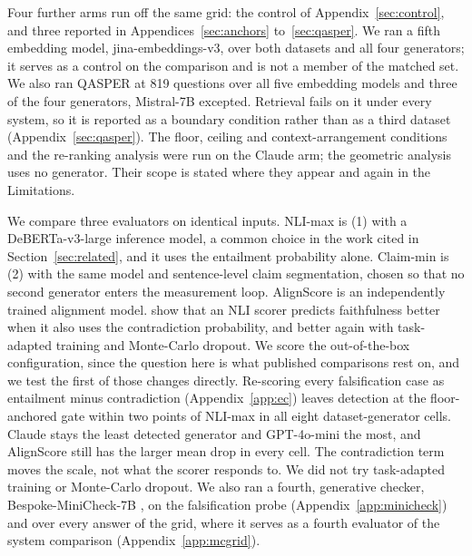 \documentclass[11pt]{article}
\newcommand{\movedref}{Appendix}            %
\newcommand{\movedref}{Section}
\begin{document}
Four further arms run off the same grid: the control of \movedref~\ref{sec:control}, and three reported in Appendices~\ref{sec:anchors} to~\ref{sec:qasper}. We ran a fifth embedding model, jina-embeddings-v3, over both datasets and all four generators; it serves as a control on the comparison and is not a member of the matched set. We also ran QASPER \citep{dasigi-etal-2021} at 819 questions over all five embedding models and three of the four generators, Mistral-7B excepted. Retrieval fails on it under every system, so it is reported as a boundary condition rather than as a third dataset (Appendix~\ref{sec:qasper}). The floor, ceiling and context-arrangement conditions and the re-ranking analysis were run on the Claude arm; the geometric analysis uses no generator. Their scope is stated where they appear and again in the Limitations.

We compare three evaluators on identical inputs. NLI-max is (1) with a DeBERTa-v3-large \citep{he-etal-2023} inference model, a common choice in the work cited in Section~\ref{sec:related}, and it uses the entailment probability alone. Claim-min is (2) with the same model and sentence-level claim segmentation, chosen so that no second generator enters the measurement loop. AlignScore \citep{zha-etal-2023} is an independently trained alignment model. \citet{steen-etal-2023} show that an NLI scorer predicts faithfulness better when it also uses the contradiction probability, and better again with task-adapted training and Monte-Carlo dropout. We score the out-of-the-box configuration, since the question here is what published comparisons rest on, and we test the first of those changes directly. Re-scoring every falsification case as entailment minus contradiction (Appendix~\ref{app:ec}) leaves detection at the floor-anchored gate within two points of NLI-max in all eight dataset-generator cells. Claude stays the least detected generator and GPT-4o-mini the most, and AlignScore still has the larger mean drop in every cell. The contradiction term moves the scale, not what the scorer responds to. We did not try task-adapted training or Monte-Carlo dropout. We also ran a fourth, generative checker, Bespoke-MiniCheck-7B \citep{tang-etal-2024}, on the falsification probe (Appendix~\ref{app:minicheck}) and over every answer of the grid, where it serves as a fourth evaluator of the system comparison (Appendix~\ref{app:mcgrid}).
\end{document}
